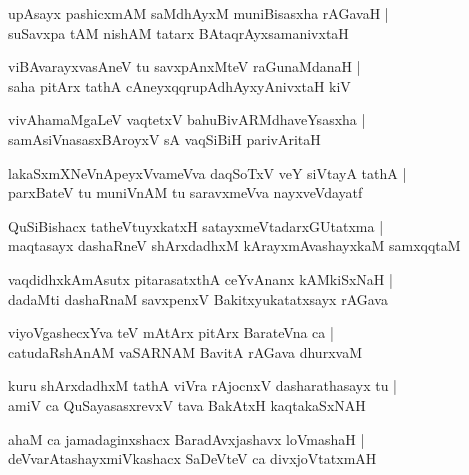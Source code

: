 \begin{shloka}
upAsayx pashicxmAM saMdhAyxM muniBisasxha rAGavaH |\\
suSavxpa tAM nishAM tatarx BAtaqrAyxsamanivxtaH 
\end{shloka}

\begin{shloka}
viBAvarayxvasAneV tu savxpAnxMteV raGunaMdanaH |\\
saha pitArx tathA cAneyxqqrupAdhAyxyAnivxtaH kiV
\end{shloka}

\begin{shloka}
vivAhamaMgaLeV vaqtetxV bahuBivARMdhaveYsasxha |\\
samAsiVnasasxBAroyxV sA vaqSiBiH parivAritaH 
\end{shloka}

\begin{shloka}
lakaSxmXNeVnApeyxVvameVva daqSoTxV veY siVtayA tathA |\\
parxBateV tu muniVnAM tu saravxmeVva nayxveVdayatf
\end{shloka}

\begin{shloka}
QuSiBishacx tatheVtuyxkatxH satayxmeVtadarxGUtatxma |\\
maqtasayx dashaRneV shArxdadhxM kArayxmAvashayxkaM samxqqtaM
\end{shloka}

\begin{shloka}
vaqdidhxkAmAsutx pitarasatxthA ceYvAnanx kAMkiSxNaH |\\
dadaMti dashaRnaM savxpenxV Bakitxyukatatxsayx rAGava
\end{shloka}

\begin{shloka}
viyoVgashecxYva teV mAtArx pitArx BarateVna ca |\\
catudaRshAnAM vaSARNAM BavitA rAGava dhurxvaM
\end{shloka}

\begin{shloka}
kuru shArxdadhxM tathA viVra rAjocnxV dasharathasayx tu |\\
amiV ca QuSayasasxrevxV tava BakAtxH kaqtakaSxNAH
\end{shloka}

\begin{shloka}
ahaM ca jamadaginxshacx BaradAvxjashavx loVmashaH |\\
deVvarAtashayxmiVkashacx SaDeVteV ca divxjoVtatxmAH
\end{shloka}

